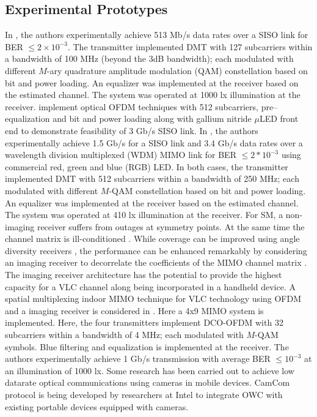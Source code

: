 \subsection{Experimental Prototypes}
\label{relatedExperiments}
In \cite{vuc10a}, the authors experimentally achieve 513 Mb/s data rates over a SISO link for BER $\leq 2\times10^{-3}$. The transmitter implemented DMT with 127 subcarriers within a bandwidth of 100 MHz (beyond the 3dB bandwidth); each modulated with different $M$-ary quadrature amplitude modulation (QAM) constellation based on bit and power loading. An equalizer was implemented at the receiver based on the estimated channel. The system was operated at 1000 lx illumination at the receiver. \cite{tso14a} implement optical OFDM techniques with 512 subcarriers, pre--equalization and bit and power loading along with gallium nitride $\mu$LED front end to demonstrate feasibility of 3 Gb/s SISO link. In \cite{cos12a}, the authors experimentally achieve 1.5 Gb/s for a SISO link and 3.4 Gb/s data rates over a wavelength division multiplexed (WDM) MIMO link for BER $\leq 2*10^{-3}$ using commercial red, green and blue (RGB) LED. In both cases, the transmitter implemented DMT with 512 subcarriers within a bandwidth of 250 MHz; each modulated with different $M$-QAM constellation based on bit and power loading. An equalizer was implemented at the receiver based on the estimated channel. The system was operated at 410 lx illumination at the receiver. For SM, a non-imaging receiver suffers from outages at symmetry points. At the same time the channel matrix is ill-conditioned \cite{zen09a}.  While coverage can be improved using angle diversity receivers \cite{car00a}, the performance can be enhanced remarkably by considering an imaging receiver to decorrelate the coefficients of the MIMO channel matrix \cite{dja00a}. The imaging receiver architecture \cite{kah98a} has the potential to provide the highest capacity for a VLC channel along being incorporated in a handheld device. A spatial multiplexing indoor MIMO technique for VLC technology using OFDM and a imaging receiver is considered in \cite{azh13a}. Here a 4x9 MIMO system is implemented. Here, the four transmitters implement DCO-OFDM with 32 subcarriers within a bandwidth of 4 MHz; each modulated with $M$-QAM symbols. Blue filtering and equalization is implemented at the receiver. The authors experimentally achieve 1 Gb/s transmission with average BER $\leq 10^{-3}$ at an illumination of 1000 lx. Some research has been carried out to achieve low datarate optical communications using cameras in mobile devices. CamCom protocol \cite{rob13a} is being developed by researchers at Intel to integrate OWC with existing portable devices equipped with cameras.



